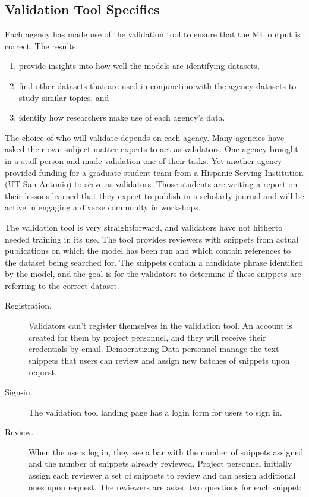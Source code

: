 \documentclass[titlepage, 11pt]{article}
\begin{document}
{\subsection{Validation Tool Specifics}
Each agency has made use of the validation tool to ensure that the ML output is correct. The results: \begin{enumerate}
    \item provide insights into how well the models are identifying datasets, 
    \item find other datasets that are used in conjunctino with the agency datasets to study similar topics, and
    \item identify how researchers make use of each agency's data.
\end{enumerate}

The choice of who will validate depends on each agency.  Many agencies have asked their own subject matter experts to act as validators.  One agency brought in a staff person and made validation one of their tasks. Yet another agency provided funding for a graduate student team from a Hispanic Serving Institution (UT San Antonio) to serve as validators.  Those students are writing a report on their lessons learned that they expect to publish in a scholarly journal and will be active in engaging a diverse community in workshops.

The validation tool is very straightforward, and validators have not hitherto needed training in its use. The tool provides reviewers with snippets from actual publications on which the model has been run and which contain references to the dataset being searched for.  The snippets contain a candidate phrase identified by the model, and the goal is for the validators to determine if these snippets are referring to the correct dataset. 

\begin{description}
\item [Registration.] Validators can’t register themselves in the validation tool. An account is created for them by project personnel, and they will receive their credentials by email. Democratizing Data personnel manage the text snippets that users can review and assign new batches of snippets upon request.   

\item [Sign-in.] The validation tool landing page has a login form for users to sign in.

\item [Review.] When the users log in, they see a bar with the number of snippets assigned and the number of snippets already reviewed. Project personnel initially assign each reviewer a set of snippets to review and can assign additional ones upon request. The reviewers are asked two questions for each snippet:


\end{description}}
\end{document}
